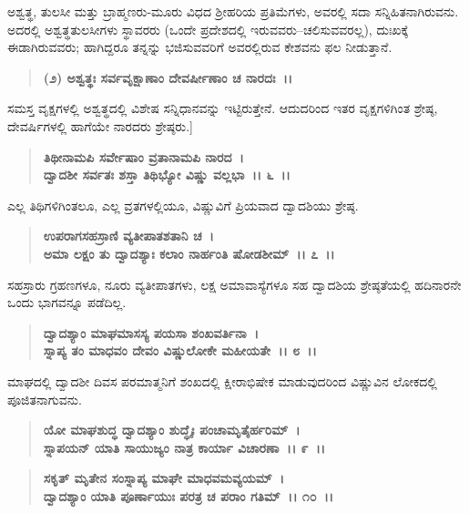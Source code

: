 ಅಶ್ವತ್ಥ, ತುಲಸೀ ಮತ್ತು ಬ್ರಾಹ್ಮಣರು-ಮೂರು ವಿಧದ ಶ‍್ರೀಹರಿಯ ಪ್ರತಿಮೆಗಳು, ಅವರಲ್ಲಿ ಸದಾ ಸನ್ನಿಹಿತನಾಗಿರುವನು. ಅದರಲ್ಲಿ ಅಶ್ವತ್ಥತುಲಸೀಗಳು ಸ್ಥಾವರರು (ಒಂದೇ ಪ್ರದೇಶದಲ್ಲಿ ಇರುವವರು--ಚಲಿಸುವವರಲ್ಲ), ದುಃಖಕ್ಕೆ ಈಡಾಗಿರುವವರು; ಹಾಗಿದ್ದರೂ ತನ್ನನ್ನು ಭಜಿಸುವವರಿಗೆ ಅವರಲ್ಲಿರುವ ಕೇಶವನು ಫಲ ನೀಡುತ್ತಾನೆ.

\begin{verse}
\textbf{(೨) ಅಶ್ವತ್ಥಃ ಸರ್ವವೃಕ್ಷಾಣಾಂ ದೇವರ್ಷೀಣಾಂ ಚ ನಾರದಃ~।।} 
\end{verse}

ಸಮಸ್ತ ವೃಕ್ಷಗಳಲ್ಲಿ ಅಶ್ವತ್ಥದಲ್ಲಿ ವಿಶೇಷ ಸನ್ನಿಧಾನವನ್ನು ಇಟ್ಟಿರುತ್ತೇನೆ. ಆದುದರಿಂದ ಇತರ ವೃಕ್ಷಗಳಿಗಿಂತ ಶ್ರೇಷ್ಠ, ದೇವರ್ಷಿಗಳಲ್ಲಿ ಹಾಗೆಯೇ ನಾರದರು ಶ್ರೇಷ್ಠರು.]

\begin{verse}
\textbf{ತಿಥೀನಾಮಪಿ ಸರ್ವೇಷಾಂ ವ್ರತಾನಾಮಪಿ ನಾರದ~।}\\\textbf{ದ್ವಾದಶೀ ಸರ್ವತಃ ಶಸ್ತಾ ತಿಥಿಭ್ಯೋ ವಿಷ್ಣು ವಲ್ಲಭಾ~।। ೬~।।}
\end{verse}

ಎಲ್ಲ ತಿಥಿಗಳಿಗಿಂತಲೂ, ಎಲ್ಲ ವ್ರತಗಳಲ್ಲಿಯೂ, ವಿಷ್ಣುವಿಗೆ ಪ್ರಿಯವಾದ ದ್ವಾದಶಿಯು ಶ್ರೇಷ್ಠ.

\begin{verse}
\textbf{ಉಪರಾಗಸಹಸ್ರಾಣಿ ವ್ಯತೀಪಾತಶತಾನಿ ಚ~।}\\\textbf{ಅಮಾ ಲಕ್ಷಂ ತು ದ್ವಾದಶ್ಯಾಃ ಕಲಾಂ ನಾರ್ಹಂತಿ ಷೋಡಶೀಮ್~।। ೭~।।}
\end{verse}

ಸಹಸ್ರಾರು ಗ್ರಹಣಗಳೂ, ನೂರು ವ್ಯತೀಪಾತಗಳು, ಲಕ್ಷ ಅಮಾವಾಸ್ಯೆಗಳೂ ಸಹ ದ್ವಾದಶಿಯ ಶ್ರೇಷ್ಠತೆಯಲ್ಲಿ ಹದಿನಾರನೇ ಒಂದು ಭಾಗವನ್ನೂ ಪಡೆದಿಲ್ಲ.

\begin{verse}
\textbf{ದ್ವಾದಶ್ಯಾಂ ಮಾಘಮಾಸಸ್ಯ ಪಯಸಾ ಶಂಖವರ್ತಿನಾ~।}\\\textbf{ಸ್ನಾಪ್ಯ ತಂ ಮಾಧವಂ ದೇವಂ ವಿಷ್ಣುಲೋಕೇ ಮಹೀಯತೇ~।। ೮~।।}
\end{verse}

ಮಾಘದಲ್ಲಿ ದ್ವಾದಶೀ ದಿವಸ ಪರಮಾತ್ಮನಿಗೆ ಶಂಖದಲ್ಲಿ ಕ್ಷೀರಾಭಿಷೇಕ ಮಾಡುವುದರಿಂದ ವಿಷ್ಣುವಿನ ಲೋಕದಲ್ಲಿ ಪೂಜಿತನಾಗುವನು.

\begin{verse}
\textbf{ಯೋ ಮಾಘಶುದ್ಧ ದ್ವಾದಶ್ಯಾಂ ಶುದ್ಧೈಃ ಪಂಚಾಮೃತೈರ್ಹರಿಮ್~।}\\\textbf{ಸ್ನಾಪಯನ್ ಯಾತಿ ಸಾಯುಜ್ಯಂ ನಾತ್ರ ಕಾರ್ಯಾ ವಿಚಾರಣಾ~।। ೯~।।}
\end{verse}

\begin{verse}
\textbf{ಸಕೃತ್ ಮೃತೇನ ಸಂಸ್ನಾಪ್ಯ ಮಾಘೇ ಮಾಧವಮವ್ಯಯಮ್~।}\\\textbf{ದ್ವಾದಶ್ಯಾಂ ಯಾತಿ ಪೂರ್ಣಾಯುಃ ಪರತ್ರ ಚ ಪರಾಂ ಗತಿಮ್~।। ೧೦~।।} 
\end{verse}

